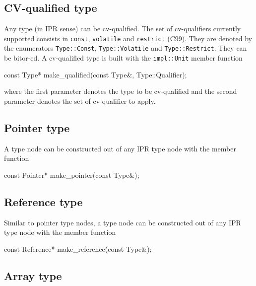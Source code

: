 \documentclass[11pt]{article}
\begin{document}
\subsection{CV-qualified type}
\label{sec:type.cv-qualified}
Any type (in IPR sense) can be cv-qualified.  The set of cv-qualifiers
currently supported consists in \texttt{const}, \texttt{volatile} and
\texttt{restrict} (C99).  They are denoted by the enumerators
\texttt{Type::Const}, \texttt{Type::Volatile} and \texttt{Type::Restrict}.
They can be bitor-ed.  A cv-qualified type is built with the
\texttt{impl::Unit} member function
\begin{Program}
  const Type* make_qualified(const Type&, Type::Qualifier);
\end{Program}
where the first parameter denotes the type to be cv-qualified and the second
parameter denotes the set of cv-qualifier to apply. 

\subsection{Pointer type}
\label{sec:type.pointer}

A  type node can be constructed out of any IPR type node
with the  member function
\begin{Program}
  const Pointer* make_pointer(const Type&);
\end{Program}

\subsection{Reference type}
\label{sec:type.reference}

Similar to pointer type nodes, a  type node can be
constructed out of any IPR type node with the  member
function 
\begin{Program}
  const Reference* make_reference(const Type&);
\end{Program}


\subsection{Array type}
\label{sec:type.array}
\end{document}
